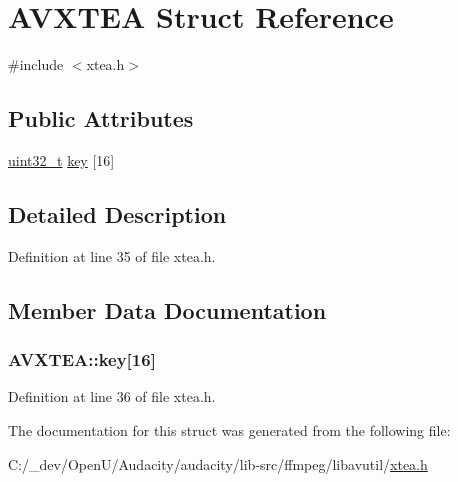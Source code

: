 \hypertarget{struct_a_v_x_t_e_a}{}\section{A\+V\+X\+T\+EA Struct Reference}
\label{struct_a_v_x_t_e_a}


{\ttfamily \#include $<$xtea.\+h$>$}

\subsection*{Public Attributes}
\begin{DoxyCompactItemize}
\item 
\hyperlink{lib-src_2ffmpeg_2win32_2stdint_8h_a6eb1e68cc391dd753bc8ce896dbb8315}{uint32\+\_\+t} \hyperlink{struct_a_v_x_t_e_a_a18f428a5b5e2f2d0afb754df292d06e3}{key} \mbox{[}16\mbox{]}
\end{DoxyCompactItemize}


\subsection{Detailed Description}


Definition at line 35 of file xtea.\+h.



\subsection{Member Data Documentation}
\subsubsection[{\texorpdfstring{key}{key}}]{ A\+V\+X\+T\+E\+A\+::key\mbox{[}16\mbox{]}}\hypertarget{struct_a_v_x_t_e_a_a18f428a5b5e2f2d0afb754df292d06e3}{}\label{struct_a_v_x_t_e_a_a18f428a5b5e2f2d0afb754df292d06e3}


Definition at line 36 of file xtea.\+h.



The documentation for this struct was generated from the following file\+:\begin{DoxyCompactItemize}
\item 
C\+:/\+\_\+dev/\+Open\+U/\+Audacity/audacity/lib-\/src/ffmpeg/libavutil/\hyperlink{xtea_8h}{xtea.\+h}\end{DoxyCompactItemize}

